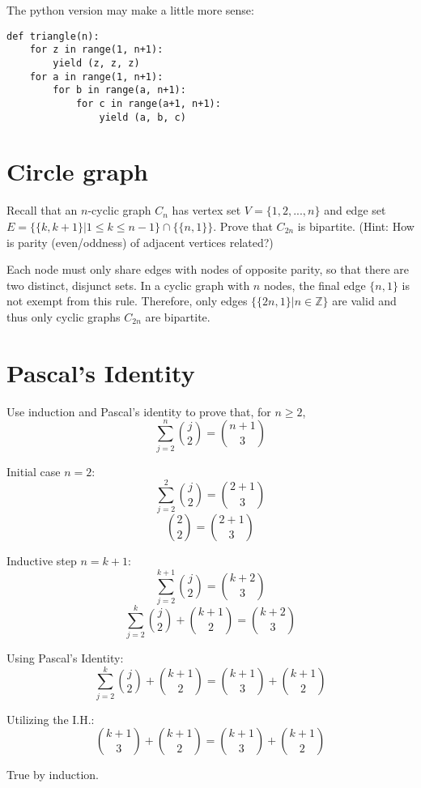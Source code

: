 \documentclass{article}
\begin{document}
\bigskip 
\noindent The python version may make a little more sense:
\begin{verbatim}
def triangle(n):
    for z in range(1, n+1):
        yield (z, z, z)
    for a in range(1, n+1):
        for b in range(a, n+1):
            for c in range(a+1, n+1):
                yield (a, b, c)
\end{verbatim}

\pagebreak

\maketitle

\section{Circle graph}
Recall that an $n$-cyclic graph $C_n$ has vertex set $V = \{1, 2, ..., n\}$ and edge set $E = \{\{k, k + 1\} | 1 \leq k \leq n - 1\} \cap \{\{n, 1\}\}$. Prove that $C_{2n}$ is bipartite. (Hint: How is parity (even/oddness) of adjacent vertices related?)

\bigskip

Each node must only share edges with nodes of opposite parity, so that there are two distinct, disjunct sets. In a cyclic graph with $n$ nodes, the final edge $\{n, 1\}$ is not exempt from this rule. Therefore, only edges $\{\{2n, 1\} | n \in \mathbb{Z}\}$ are valid and thus only cyclic graphs $C_{2n}$ are bipartite.

\section{Pascal's Identity}
Use induction and Pascal's identity to prove that, for $n \geq 2$,
\[
    \sum^n_{j = 2} \binom{j}{2} = \binom{n + 1}{3}
\]

\bigskip

\noindent Initial case $n = 2$:
\[
    \sum^2_{j = 2} \binom{j}{2} = \binom{2 + 1}{3}
\]
\[
    \binom{2}{2} = \binom{2 + 1}{3}
\]

\noindent Inductive step $n = k + 1$:
\[
    \sum^{k + 1}_{j = 2} \binom{j}{2} = \binom{k + 2}{3}
\]
\[
    \sum^{k}_{j = 2} \binom{j}{2} + \binom{k + 1}{2} = \binom{k + 2}{3}
\]

\noindent Using Pascal's Identity:
\[
    \sum^{k}_{j = 2} \binom{j}{2} + \binom{k + 1}{2} = \binom{k + 1}{3} + \binom{k + 1}{2}
\]

\noindent Utilizing the I.H.:
\[
    \binom{k + 1}{3} + \binom{k + 1}{2} = \binom{k + 1}{3} + \binom{k + 1}{2}
\]

\noindent True by induction.
\end{document}

